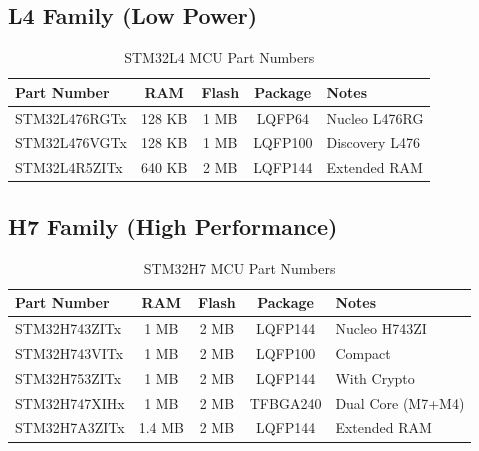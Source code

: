 \subsection{L4 Family (Low Power)}

\begin{table}[H]
    \centering
    \caption{STM32L4 MCU Part Numbers}
    \label{tab:l4_parts}
    \small
    \begin{tabular}{|l|c|c|c|l|}
        \hline
        \textbf{Part Number} & \textbf{RAM} & \textbf{Flash} & \textbf{Package} & \textbf{Notes} \\
        \hline
        STM32L476RGTx        & 128 KB       & 1 MB           & LQFP64           & Nucleo L476RG  \\
        STM32L476VGTx        & 128 KB       & 1 MB           & LQFP100          & Discovery L476 \\
        STM32L4R5ZITx        & 640 KB       & 2 MB           & LQFP144          & Extended RAM   \\
        \hline
    \end{tabular}
\end{table}

\subsection{H7 Family (High Performance)}

\begin{table}[H]
    \centering
    \caption{STM32H7 MCU Part Numbers}
    \label{tab:h7_parts}
    \small
    \begin{tabular}{|l|c|c|c|l|}
        \hline
        \textbf{Part Number} & \textbf{RAM} & \textbf{Flash} & \textbf{Package} & \textbf{Notes}    \\
        \hline
        STM32H743ZITx        & 1 MB         & 2 MB           & LQFP144          & Nucleo H743ZI     \\
        STM32H743VITx        & 1 MB         & 2 MB           & LQFP100          & Compact           \\
        STM32H753ZITx        & 1 MB         & 2 MB           & LQFP144          & With Crypto       \\
        STM32H747XIHx        & 1 MB         & 2 MB           & TFBGA240         & Dual Core (M7+M4) \\
        STM32H7A3ZITx        & 1.4 MB       & 2 MB           & LQFP144          & Extended RAM      \\
        \hline
    \end{tabular}
\end{table}

